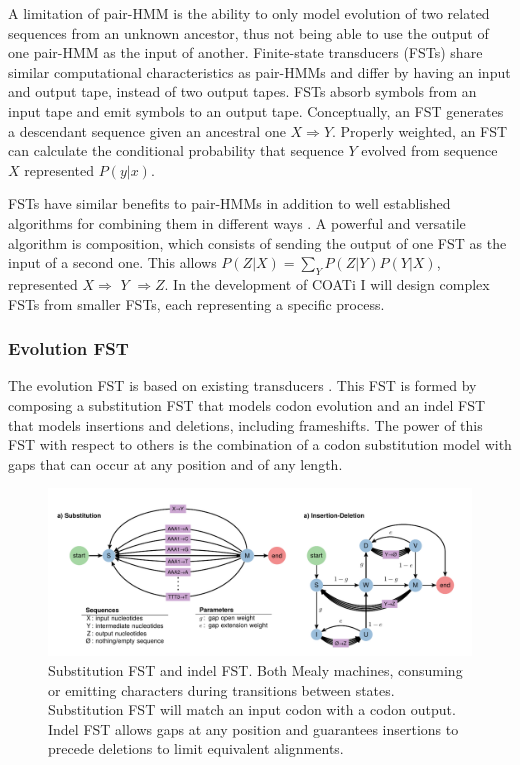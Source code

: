 A limitation of pair-HMM is the ability to only model evolution of two related
sequences from an unknown ancestor, thus not being able to use the output of one
pair-HMM as the input of another.
Finite-state transducers (FSTs) share similar computational characteristics as
pair-HMMs and differ by having an input and output tape, instead of two output
tapes.
FSTs absorb symbols from an input tape and emit symbols to an output tape.
Conceptually, an FST generates a descendant sequence given an ancestral one
$X \Rightarrow Y$.
Properly weighted, an FST can calculate the conditional probability that
sequence $Y$ evolved from sequence $X$ represented $P(y|x)$.

FSTs have similar benefits to pair-HMMs in addition to well established
algorithms for combining them in different ways .
A powerful and versatile algorithm is composition, which consists of sending the
output of one FST as the input of a second one.
This allows $P(Z|X) = \sum_Y P(Z|Y) P(Y|X)$, represented $X \Rightarrow$
$Y$ $\Rightarrow Z$.
In the development of COATi I will design complex FSTs from smaller FSTs, each
representing a specific process.

\subsubsection{Evolution FST}

The evolution FST is based on existing transducers .
This FST is formed by composing a substitution FST that models codon
evolution and an indel FST that models insertions and deletions, including
frameshifts.
The power of this FST with respect to others is the combination of a codon
substitution model with gaps that can occur at any position and of any length.

\begin{figure}[h]
\centering
    \includegraphics[width=\textwidth]{figures/fig-evolution-fst.pdf}
    \caption{Substitution FST and indel FST. Both Mealy machines, consuming or
    emitting characters during transitions between states. Substitution FST will
    match an input codon with a codon output.
    Indel FST allows gaps at any position and guarantees insertions to precede
    deletions to limit equivalent alignments.}
    \label{fig:evolution-fst}
\end{figure}

